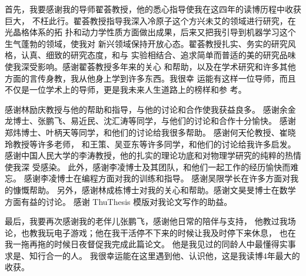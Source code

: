 \begin{acknowledgement}

首先，我要感谢我的导师翟荟教授，他的悉心指导使我在这四年的读博历程中收获巨大，
不枉此行。翟荟教授指导我深入冷原子这个方兴未艾的领域进行研究，在光晶格体系的拓
扑和动力学性质方面做出成果，后来又把我引导到机器学习这个生气蓬勃的领域，使我对
新兴领域保持开放心态。翟荟教授扎实、务实的研究风格，认真、细致的研究态度，和与
实验相结合、追求简单而普适的美的研究品味使我深受影响。感谢翟荟教授多年来的关心
和帮助，以及在学术研究和许多其他方面的言传身教，我从他身上学到许多东西。我很幸
运能有这样一位导师，而且不仅是一位学术上的导师，更是我未来人生道路上的榜样和参
考。

感谢林励庆教授与他的帮助和指导，与他的讨论和合作使我获益良多。
感谢余金龙博士、张鹏飞、易近民、沈汇涛等同学，与他们的讨论和合作十分愉快。
感谢郑炜博士、叶柄天等同学，和他们的讨论给我很多帮助。
感谢何天伦教授、崔晓玲教授等许多老师，
和王策、吴亚东等许多同学，和他们的讨论给我许多启发。
感谢中国人民大学的李涛教授，他的扎实的理论功底和对物理学研究的纯粹的热情使我深
受感染。
此外，感谢李凌博士及其团队，和他们一起工作的经历愉快而难忘。
感谢李凌博士在编程方面对我的训练和指导。
感谢吴限学长在许多方面对我的慷慨帮助。
另外，感谢林成栋博士对我的关心和帮助。感谢文昊旻博士在数学方面有益的讨论。
感谢 ThuThesis 模版对我论文写作的助益。

最后，我要再次感谢我的老伴儿张鹏飞，感谢他日常的陪伴与支持，
他教过我场论，也教我玩电子游戏；他在我干活停不下来的时候让我及时停下来休息，
也在我一拖再拖的时候日夜督促我完成此篇论文。
他是我见过的同龄人中最懂得实事求是、知行合一的人。
我很幸运能在这里遇到他、认识他，这是我读博4年最大的收获。

\end{acknowledgement}
